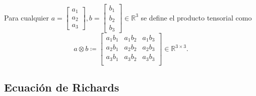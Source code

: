 Para cualquier
\begin{math}
	a=
	\begin{bmatrix}
		a_{1} \\
		a_{2} \\
		a_{3}
	\end{bmatrix},
	b=
	\begin{bmatrix}
		b_{1} \\
		b_{2} \\
		b_{3}
	\end{bmatrix}\in\mathbb{R}^{3}
\end{math}
se define el producto tensorial como
\begin{equation*}
	a\otimes b\coloneqq
	\begin{bmatrix}
		a_{1}b_{1} & a_{1}b_{2} & a_{1}b_{3} \\
		a_{2}b_{1} & a_{2}b_{2} & a_{2}b_{3} \\
		a_{3}b_{1} & a_{3}b_{2} & a_{3}b_{3} \\
	\end{bmatrix}\in\mathbb{R}^{3\times 3}.
\end{equation*}

\subsection*{Ecuación de Richards}

